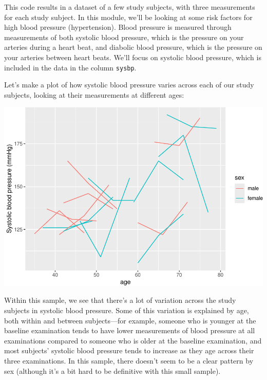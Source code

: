 \documentclass[
]{book}
\newenvironment{Shaded}{\begin{snugshade}}{\end{snugshade}}
\newcommand{\DataTypeTok}[1]{\textcolor[rgb]{0.13,0.29,0.53}{#1}}
\newcommand{\KeywordTok}[1]{\textcolor[rgb]{0.13,0.29,0.53}{\textbf{#1}}}
\newcommand{\NormalTok}[1]{#1}
\newcommand{\OperatorTok}[1]{\textcolor[rgb]{0.81,0.36,0.00}{\textbf{#1}}}
\newcommand{\StringTok}[1]{\textcolor[rgb]{0.31,0.60,0.02}{#1}}
\begin{document}
This code results in a dataset of a few study subjects, with three measurements
for each study subject. In this module, we'll be looking at some risk factors
for high blood pressure (hypertension). Blood pressure is measured through
measurements of both systolic blood pressure, which is the pressure on your
arteries during a heart beat, and diabolic blood pressure, which is the pressure
on your arteries between heart beats. We'll focus on systolic blood
pressure, which is included in the data in the column \texttt{sysbp}.

Let's make a plot of how systolic blood pressure varies across each of our
study subjects, looking at their measurements at different ages:

\begin{Shaded}
\end{Shaded}

\includegraphics{adv_epi_analysis_files/figure-latex/unnamed-chunk-284-1.pdf}

Within this sample, we see that there's a lot of variation across the study
subjects in systolic blood pressure. Some of this variation is explained by age,
both within and between subjects---for example, someone who is younger at the
baseline examination tends to have lower measurements of blood pressure at all
examinations compared to someone who is older at the baseline examination, and
most subjects' systolic blood pressure tends to increase as they age across
their three examinations. In this sample, there doesn't seem to be a clear
pattern by sex (although it's a bit hard to be definitive with this small
sample).
\end{document}
